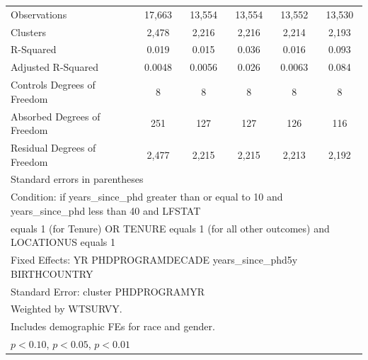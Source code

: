 \begin{table}[htbp]
\begin{tabular}{l*{5}{c}}
Observations&      17,663         &      13,554         &      13,554         &      13,552         &      13,530         \\
Clusters&       2,478         &       2,216         &       2,216         &       2,214         &       2,193         \\
R-Squared&       0.019         &       0.015         &       0.036         &       0.016         &       0.093         \\
Adjusted R-Squared&      0.0048         &      0.0056         &       0.026         &      0.0063         &       0.084         \\
Controls Degrees of Freedom&           8         &           8         &           8         &           8         &           8         \\
Absorbed Degrees of Freedom&         251         &         127         &         127         &         126         &         116         \\
Residual Degrees of Freedom&       2,477         &       2,215         &       2,215         &       2,213         &       2,192         \\
\hline\hline
\multicolumn{6}{l}{\footnotesize Standard errors in parentheses}\\
\multicolumn{6}{l}{\footnotesize Condition: if years\_since\_phd greater than or equal to 10 and years\_since\_phd less than 40 and LFSTAT}\\
\multicolumn{6}{l}{\footnotesize equals 1 (for Tenure) OR TENURE equals 1 (for all other outcomes) and LOCATIONUS equals 1}\\
\multicolumn{6}{l}{\footnotesize Fixed Effects: YR PHDPROGRAMDECADE years\_since\_phd5y BIRTHCOUNTRY}\\
\multicolumn{6}{l}{\footnotesize Standard Error: cluster PHDPROGRAMYR}\\
\multicolumn{6}{l}{\footnotesize Weighted by WTSURVY.}\\
\multicolumn{6}{l}{\footnotesize Includes demographic FEs for race and gender.}\\
\multicolumn{6}{l}{\footnotesize \sym{*} \(p<0.10\), \sym{**} \(p<0.05\), \sym{***} \(p<0.01\)}\\
\end{tabular}
\end{table}
